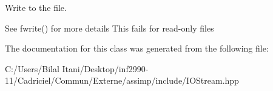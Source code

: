Write to the file. 

See fwrite() for more details This fails for read-\/only files 

The documentation for this class was generated from the following file\+:\begin{DoxyCompactItemize}
\item 
C\+:/\+Users/\+Bilal Itani/\+Desktop/inf2990-\/11/\+Cadriciel/\+Commun/\+Externe/assimp/include/I\+O\+Stream.\+hpp\end{DoxyCompactItemize}
